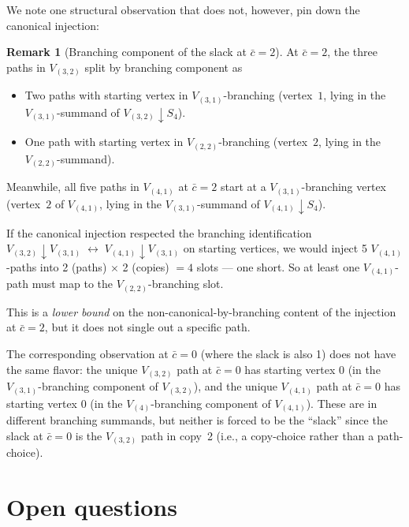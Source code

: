 \documentclass[11pt]{article}
\theoremstyle{definition}
\newtheorem{remark}[theorem]{Remark}
\begin{document}
We note one structural observation that does not, however, pin down the canonical injection:

\begin{remark}[Branching component of the slack at $\bar c = 2$]\label{rem:branching}
At $\bar c = 2$, the three paths in $V_{(3,2)}$ split by branching component as
\begin{itemize}[leftmargin=2em,topsep=0.2em,itemsep=0.1em]
\item Two paths with starting vertex in $V_{(3,1)}$-branching (vertex~$1$, lying in the $V_{(3,1)}$-summand of $V_{(3,2)} \downarrow S_4$).
\item One path with starting vertex in $V_{(2,2)}$-branching (vertex~$2$, lying in the $V_{(2,2)}$-summand).
\end{itemize}
Meanwhile, all five paths in $V_{(4,1)}$ at $\bar c = 2$ start at a $V_{(3,1)}$-branching vertex (vertex~$2$ of $V_{(4,1)}$, lying in the $V_{(3,1)}$-summand of $V_{(4,1)} \downarrow S_4$).

If the canonical injection respected the branching identification $V_{(3,2)} \downarrow V_{(3,1)} \;\leftrightarrow\; V_{(4,1)} \downarrow V_{(3,1)}$ on starting vertices, we would inject 5 $V_{(4,1)}$-paths into 2 (paths) $\times$ 2 (copies) $= 4$ slots --- one short. So at least one $V_{(4,1)}$-path must map to the $V_{(2,2)}$-branching slot.

This is a \emph{lower bound} on the non-canonical-by-branching content of the injection at $\bar c = 2$, but it does not single out a specific path.
\end{remark}

The corresponding observation at $\bar c = 0$ (where the slack is also 1) does not have the same flavor: the unique $V_{(3,2)}$ path at $\bar c = 0$ has starting vertex 0 (in the $V_{(3,1)}$-branching component of $V_{(3,2)}$), and the unique $V_{(4,1)}$ path at $\bar c = 0$ has starting vertex 0 (in the $V_{(4)}$-branching component of $V_{(4,1)}$). These are in different branching summands, but neither is forced to be the ``slack'' since the slack at $\bar c = 0$ is the $V_{(3,2)}$ path in copy~2 (i.e., a copy-choice rather than a path-choice).

\section{Open questions}
\end{document}
